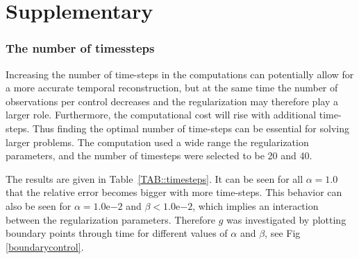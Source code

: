 \documentclass[11pt,a4paper]{article}
\begin{document}
\clearpage
\section{Supplementary}

\subsubsection{The number of timessteps}
Increasing the number of time-steps in the computations can potentially allow for a more accurate temporal reconstruction, but at the same time the number of observations per control decreases and the regularization may therefore play a larger role. Furthermore, the computational cost will rise with additional time-steps. Thus finding the optimal number of time-steps can be essential for solving larger problems. The computation used a wide range the regularization parameters, and the number of timesteps were selected to be 20 and 40.

The results are given in Table~\ref{TAB::timesteps}. It can be seen for all $\alpha=1.0$ that the relative error becomes bigger with more time-steps. This behavior can also be seen for $\alpha=1.0\mathrm{e}{-2}$ and $\beta < 1.0\mathrm{e}{-2}$, which implies an interaction between the regularization parameters. Therefore $g$ was investigated by plotting boundary points through time for different values of $\alpha$ and $\beta$, see Fig \ref{boundarycontrol}.
\end{document}

